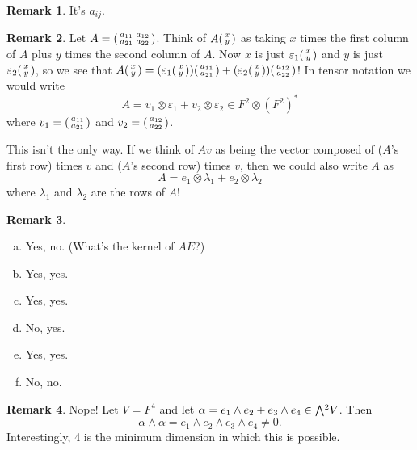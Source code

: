 \documentclass[11pt,oneside]{amsart}
\theoremstyle{definition}
\newtheorem{remark}{Remark}
\newcommand{\eps}{\varepsilon}
\newcommand*\colvec[1]{\begin{psmallmatrix}#1\end{psmallmatrix}}
\newcommand{\extp}{\mathchoice{{\textstyle\bigwedge}}%
    {{\bigwedge}}%
    {{\textstyle\wedge}}%
    {{\scriptstyle\wedge}}}
\begin{document}
    \begin{remark}
        It's $a_{ij}$.
    \end{remark}

    \begin{remark}
        Let $A=\begin{psmallmatrix}a_{11}&a_{12}\\a_{21}&a_{22}\end{psmallmatrix}$. Think of $A\colvec{x\\y}$ as taking $x$ times the first column of $A$ plus $y$ times the second column of $A$. Now $x$ is just $\eps_1\colvec{x\\y}$ and $y$ is just $\eps_2\colvec{x\\y}$, so we see that $A\colvec{x\\y}=(\eps_1\colvec{x\\y})\colvec{a_{11}\\a_{21}}+(\eps_2\colvec{x\\y})\colvec{a_{12}\\a_{22}}$! In tensor notation we would write
        \[A=v_1\otimes \eps_1+v_2\otimes \eps_2\in F^2\otimes (F^2)^*\]
        where $v_1=\colvec{a_{11}\\a_{21}}$ and $v_2=\colvec{a_{12}\\a_{22}}$.

        This isn't the only way. If we think of $Av$ as being the vector composed of ($A$'s first row) times $v$ and ($A$'s second row) times $v$, then we could also write $A$ as
        \[A=e_1\otimes \lambda_1+e_2\otimes \lambda_2\]
        where $\lambda_1$ and $\lambda_2$ are the rows of $A$!
    \end{remark}

    \begin{remark}
        \begin{enumerate}[(a)]
            \item Yes, no. (What's the kernel of $AE$?)
            \item Yes, yes.
            \item Yes, yes.
            \item No, yes.
            \item Yes, yes.
            \item No, no.
        \end{enumerate}
    \end{remark}

    \begin{remark}
        Nope! Let $V=F^4$ and let $\alpha=e_1\wedge e_2+e_3\wedge e_4\in \extp^2 V$. Then
        \[\alpha\wedge\alpha=e_1\wedge e_2\wedge e_3\wedge e_4\neq 0.\]
        Interestingly, 4 is the minimum dimension in which this is possible.
    \end{remark}
\end{document}

